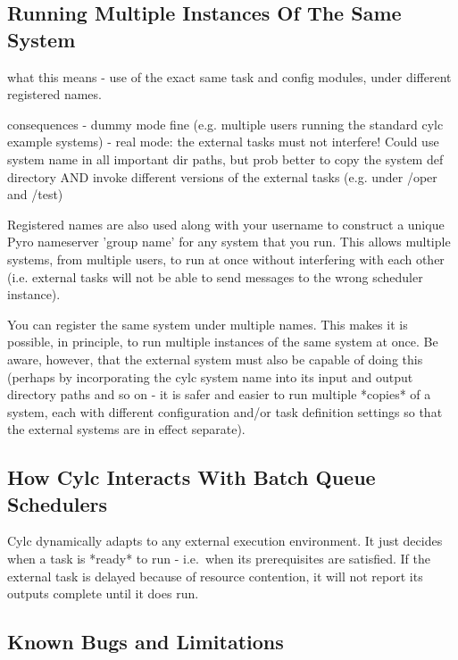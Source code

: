 \documentclass[11pt,a4paper]{article}
\begin{document}
\subsection{Running Multiple Instances Of The Same System}
\label{RunningMultipleInstancesOfTheSameSystem}

what this means - use of the exact same task and config modules, under 
different registered names.

consequences - dummy mode fine (e.g. multiple users running the standard
cylc example systems)
             - real mode: the external tasks must not interfere! Could
             use system name in all important dir paths, but prob better 
             to copy the system def directory AND invoke different versions
             of the external tasks (e.g. under /oper and /test)

    Registered names are also used along with your username to construct
    a unique Pyro nameserver 'group name' for any system that you run.
    This allows multiple systems, from multiple users, to run at once
    without interfering with each other (i.e. external tasks will not
    be able to send messages to the wrong scheduler instance).
    
    You can register the same system under multiple names. This makes
    it is possible, in principle, to run multiple instances of the
    same system at once. Be aware, however, that the external system
    must also be capable of doing this (perhaps by incorporating the
    cylc system name into its input and output directory paths and
    so on - it is safer and easier to run multiple *copies* of a
    system, each with different configuration and/or task definition
    settings so that the external systems are in effect separate).


\subsection{How Cylc Interacts With Batch Queue Schedulers}
\label{HowCylcInteractsWithBatchQueueSchedulers}

Cylc dynamically adapts to any external execution environment. It just
decides when a task is *ready* to run - i.e.\ when its prerequisites 
are satisfied.  If the external task is delayed because of resource
contention, it will not report its outputs complete until it does run.

\subsection{Known Bugs and Limitations}
\end{document}
